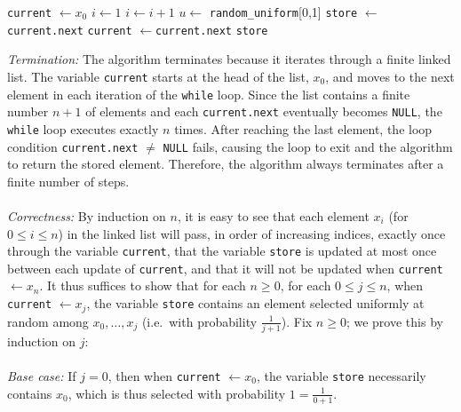 \begin{solution}
{\begin{algorithm}
\begin{algorithmic}
                \State \texttt{current} \( \gets x_0 \)
                \State \( i \gets 1 \)
                \State \( i \gets i + 1 \)
                \State \( u \gets \) \texttt{random\_uniform}[0,1]
                \State \texttt{store} \( \gets \)\texttt{current.next}
                \EndIf
                \State \texttt{current} \( \gets \)\texttt{current.next}
                \EndWhile
                \State \Return \texttt{store}
            \end{algorithmic}
        \end{algorithm}}
    \noindent\textit{Termination:} The algorithm terminates because it iterates through a finite linked list. The variable \texttt{current} starts at the head of the list, \( x_0 \), and moves to the next element in each iteration of the \texttt{while} loop. Since the list contains a finite number \( n+1 \) of elements and each \texttt{current.next} eventually becomes \texttt{NULL}, the \texttt{while} loop executes exactly \( n \) times. After reaching the last element, the loop condition \texttt{current.next} \( \neq \) \texttt{NULL} fails, causing the loop to exit and the algorithm to return the stored element. Therefore, the algorithm always terminates after a finite number of steps.
    \\\\
    \textit{Correctness:}
    By induction on \( n \), it is easy to see that each element \( x_i \) (for \( 0 \leq i \leq n \)) in the linked list will pass, in order of increasing indices, exactly once through the variable \texttt{current}, that the variable \texttt{store} is updated at most once between each update of \texttt{current}, and that it will not be updated when \texttt{current} \( \gets x_n \). It thus suffices to show that for each \( n \geq 0 \), for each \( 0 \leq j \leq n \), when \texttt{current} \( \gets x_j \), the variable \texttt{store} contains an element selected uniformly at random among \( x_0, \dots, x_j \) (i.e.\ with probability \( \frac{1}{j+1} \)). Fix \( n \geq 0 \); we prove this by induction on \( j \):
    \\\\
    \textit{Base case:} If \( j=0 \), then when \texttt{current} \( \gets x_0 \), the variable \texttt{store} necessarily contains \( x_0 \), which is thus selected with probability \( 1 = \frac{1}{0+1} \).
    \\\\

\end{solution}
